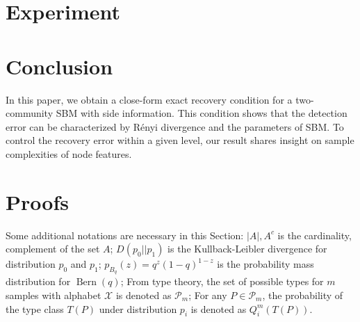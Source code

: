 \documentclass[conference]{IEEEtran}
\DeclareMathOperator{\Bern}{Bern}
\begin{document}
\section{Experiment}
\section{Conclusion}\label{s:conclusion}
In this paper, we obtain a close-form exact recovery condition for a two-community SBM with side information. This condition
shows that the detection error can be characterized by Rényi divergence and the parameters of SBM. To control the recovery error within a given level,
our result shares insight on sample complexities of node features.
\section{Proofs}\label{s:proof}
Some additional notations are necessary in this Section: $|A|, A^c$ is the cardinality, complement of the set $A$;
$D(p_0 || p_1)$ is the Kullback-Leibler divergence for distribution $p_0$ and $p_1$;
$p_{B_q}(z) = q^z(1-q)^{1-z}$ is the probability mass distribution for $\Bern(q)$;
From type theory, the set of possible types
for $m$ samples with alphabet $\mathcal{X}$ is denoted as $\mathcal{P}_m$; For any $P\in \mathcal{P}_m$, the probability of the type
class $T(P)$ under distribution $p_i$ is denoted as $Q_i^{m}(T(P))$.
\end{document}
